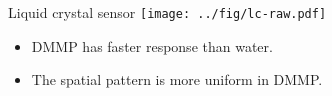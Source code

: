 \documentclass[10pt]{beamer}
\begin{document}

\begin{frame}{Liquid crystal sensor}
  \texttt{[image: ../fig/lc-raw.pdf]}
  \vspace{0.1in}
  \begin{itemize}
  \item DMMP has faster response than water.
    \vspace{0.1in}
  \item The spatial pattern is more uniform in DMMP.
  \end{itemize}
\end{frame}
\end{document}

